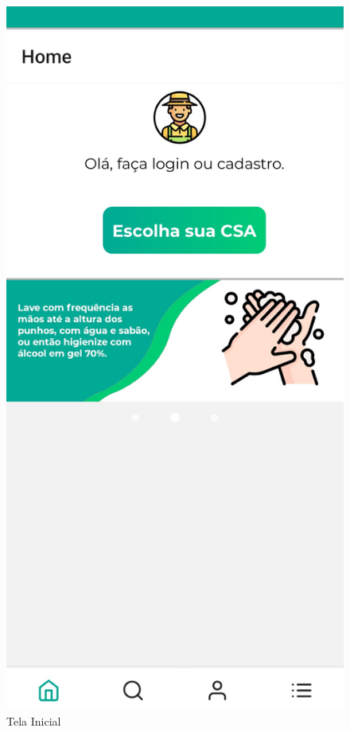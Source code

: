 \begin{figure}[h]
	\centering
	\includegraphics[keepaspectratio=true,scale=0.16]{figuras/inicial.jpg}
	\caption{Tela Inicial}
        \label{tela-inicial-app}
\end{figure}

